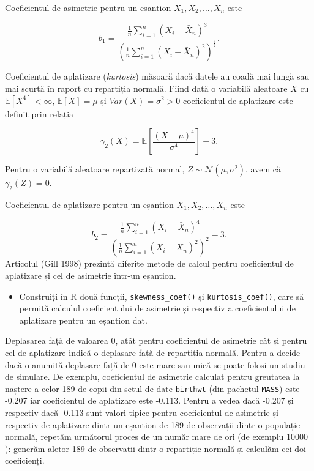\documentclass[]{article}
\newenvironment{frshaded*}{%
  \def\FrameCommand{\fboxrule=\FrameRule\fboxsep=\FrameSep \fcolorbox{framecolor}{shadecolor1}}%
  \MakeFramed {\advance\hsize-\width \FrameRestore}}%
{\endMakeFramed}
\newenvironment{rmdblock}[1]
  {\begin{frshaded*}
  \begin{itemize}
  \renewcommand{\labelitemi}{
    \raisebox{-.7\height}[0pt][0pt]{
      {\setkeys{Gin}{width=2em,keepaspectratio}\texttt{[image: images/icons/\#1]}}
    }
  }
  \item
  }
  {
  \end{itemize}
  \end{frshaded*}
  }
\newenvironment{rmdexercise}
  {\begin{rmdblock}{exercise}}
  {\end{rmdblock}}
\begin{document}
Coeficientul de asimetrie pentru un eșantion \(X_1, X_2, \ldots, X_n\)
este

\[
  b_1 = \frac{\frac{1}{n}\sum_{i = 1}^{n} (X_i - \bar{X}_n)^3}{\left(\frac{1}{n}\sum_{i = 1}^{n} (X_i - \bar{X}_n)^2\right)^{\frac{3}{2}}}.
\]

Coeficientul de aplatizare (\emph{kurtosis}) măsoară dacă datele au
coadă mai lungă sau mai scurtă în raport cu repartiția normală. Fiind
dată o variabilă aleatoare \(X\) cu \(\mathbb{E}[X^4]<\infty\),
\(\mathbb{E}[X]=\mu\) și \(Var(X)=\sigma^2>0\) coeficientul de
aplatizare este definit prin relația

\[
  \gamma_2(X) = \mathbb{E}\left[\frac{(X-\mu)^4}{\sigma^4}\right] - 3.
\]

Pentru o variabilă aleatoare repartizată normal,
\(Z\sim \mathcal{N}(\mu, \sigma^2)\), avem că \(\gamma_2(Z) = 0\).

Coeficientul de aplatizare pentru un eșantion \(X_1, X_2, \ldots, X_n\)
este

\[
  b_2 = \frac{\frac{1}{n}\sum_{i = 1}^{n} (X_i - \bar{X}_n)^4}{\left(\frac{1}{n}\sum_{i = 1}^{n} (X_i - \bar{X}_n)^2\right)^{2}} - 3.
\] Articolul (Gill 1998) prezintă diferite metode de calcul pentru
coeficientul de aplatizare și cel de asimetrie într-un eșantion.

\begin{rmdexercise}
Construiți în R două funcții, \texttt{skewness\_coef()} și
\texttt{kurtosis\_coef()}, care să permită calculul coeficientului de
asimetrie și respectiv a coeficientului de aplatizare pentru un eșantion
dat.
\end{rmdexercise}

Deplasarea față de valoarea \(0\), atât pentru coeficientul de asimetrie
cât și pentru cel de aplatizare indică o deplasare față de repartiția
normală. Pentru a decide dacă o anumită deplasare față de \(0\) este
mare sau mică se poate folosi un studiu de simulare. De exemplu,
coeficientul de asimetrie calculat pentru greutatea la naștere a celor
189 de copii din setul de date \texttt{birthwt} (din pachetul
\texttt{MASS}) este -0.207 iar coeficientul de aplatizare este -0.113.
Pentru a vedea dacă -0.207 și respectiv dacă -0.113 sunt valori tipice
pentru coeficientul de asimetrie și respectiv de aplatizare dintr-un
eșantion de 189 de observații dintr-o populație normală, repetăm
următorul proces de un număr mare de ori (de exemplu \(10000\)): generăm
aletor 189 de observații dintr-o repartiție normală și calculăm cei doi
coeficienți.
\end{document}
